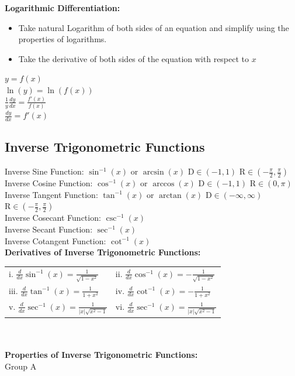 \documentclass[14pt]{article}
\begin{document}
    \textbf{Logarithmic Differentiation:}
    \begin{itemize}
        \item Take natural Logarithm of both sides of an equation and
        simplify using the properties of logarithms.
        \item Take the derivative of both sides of the equation with
        respect to $x$
    \end{itemize}
    $y=f(x)$\\
    $\ln(y)=\ln(f(x))$\\
    $\frac{1}{y} \frac{dy}{dx} = \frac{f'(x)}{f(x)}$\\
    $\frac{dy}{dx}=f'(x)$
    \subsection{Inverse Trigonometric Functions}
    Inverse Sine Function: $\sin^{-1}(x)$ or $\arcsin(x)$
    $\mathrm{D}\in(-1,1)$
    $\mathrm{R}\in\left(-\frac{\pi}{2},\frac{\pi}{2}\right)$\\
    Inverse Cosine Function: $\cos^{-1}(x)$ or $\arccos(x)$
    $\mathrm{D}\in(-1,1)$ $\mathrm{R}\in(0, \pi)$\\
    Inverse Tangent Function: $\tan^{-1}(x)$ or $\arctan(x)$
    $\mathrm{D}\in(-\infty,\infty)$
    $\mathrm{R}\in\left(-\frac{\pi}{2},\frac{\pi}{2}\right)$\\
    Inverse Cosecant Function: $\csc^{-1}(x)$\\
    Inverse Secant Function: $\sec^{-1}(x)$\\
    Inverse Cotangent Function: $\cot^{-1}(x)$\\
    \textbf{Derivatives of Inverse Trigonometric Functions:}\\
    \begin{tabular}{p{5cm}p{5cm}}
        i. $\frac{d}{dx}\sin^{-1}(x)=\frac{1}{\sqrt{1-x^2}}$ & ii.
        $\frac{d}{dx}\cos^{-1}(x)=-\frac{1}{\sqrt{1-x^2}}$\\
        iii. $\frac{d}{dx}\tan^{-1}(x)=\frac{1}{1+x^2}$ & iv.
        $\frac{d}{dx}\cot^{-1}(x)=-\frac{1}{1+x^2}$\\
        v. $\frac{d}{dx}\sec^{-1}(x)=\frac{1}{|x|\sqrt{x^2-1}}$ & vi.
    $\frac{d}{dx}\sec^{-1}(x)=\frac{1}{|x|\sqrt{x^2-1}}$
    \end{tabular}\\\\
    \textbf{Properties of Inverse Trigonometric Functions:}\\
    Group A\\
\end{document}
